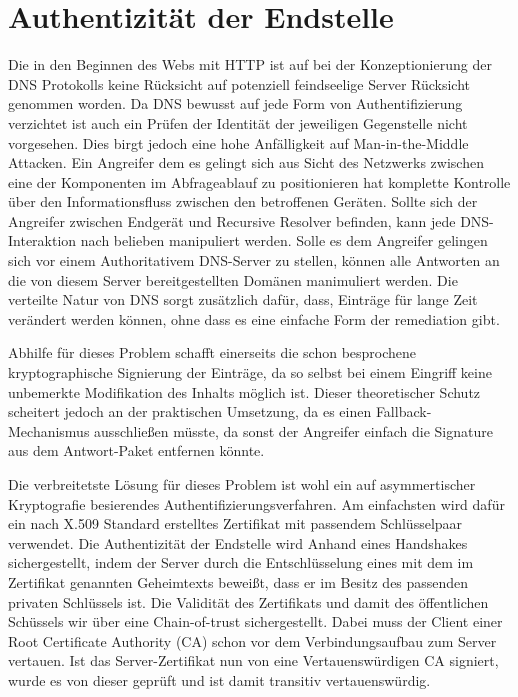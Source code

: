 
\section{Authentizität der Endstelle}
Die in den Beginnen des Webs mit HTTP ist auf bei der Konzeptionierung der DNS Protokolls keine Rücksicht auf potenziell feindseelige Server Rücksicht genommen worden. Da DNS bewusst auf jede Form von Authentifizierung verzichtet ist auch ein Prüfen der Identität der jeweiligen Gegenstelle nicht vorgesehen. Dies birgt jedoch eine hohe Anfälligkeit auf Man-in-the-Middle Attacken. Ein Angreifer dem es gelingt sich aus Sicht des Netzwerks zwischen eine der Komponenten im Abfrageablauf zu positionieren hat komplette Kontrolle über den Informationsfluss zwischen den betroffenen Geräten. Sollte sich der Angreifer zwischen Endgerät und Recursive Resolver befinden, kann jede DNS-Interaktion nach belieben manipuliert werden. Solle es dem Angreifer gelingen sich vor einem Authoritativem DNS-Server zu stellen, können alle Antworten an die von diesem Server bereitgestellten Domänen manimuliert werden. Die verteilte Natur von DNS sorgt zusätzlich dafür, dass, Einträge für lange Zeit verändert werden können, ohne dass es eine einfache Form der remediation gibt.

Abhilfe für dieses Problem schafft einerseits die schon besprochene kryptographische Signierung der Einträge, da so selbst bei einem Eingriff keine unbemerkte Modifikation des Inhalts möglich ist. Dieser theoretischer Schutz scheitert jedoch an der praktischen Umsetzung, da es einen Fallback-Mechanismus ausschließen müsste, da sonst der Angreifer einfach die Signature aus dem Antwort-Paket entfernen könnte.

Die verbreitetste Lösung für dieses Problem ist wohl ein auf asymmertischer Kryptografie besierendes Authentifizierungsverfahren. Am einfachsten wird dafür ein nach X.509 Standard erstelltes Zertifikat mit passendem Schlüsselpaar verwendet. Die Authentizität der Endstelle wird Anhand eines Handshakes sichergestellt, indem der Server durch die Entschlüsselung eines mit dem im Zertifikat genannten Geheimtexts beweißt, dass er im Besitz des passenden privaten Schlüssels ist. Die Validität des Zertifikats und damit des öffentlichen Schüssels wir über eine Chain-of-trust sichergestellt. Dabei muss der Client einer Root Certificate Authority (CA) schon vor dem Verbindungsaufbau zum Server vertauen. Ist das Server-Zertifikat nun von eine Vertauenswürdigen CA signiert, wurde es von dieser geprüft und ist damit transitiv vertauenswürdig.

